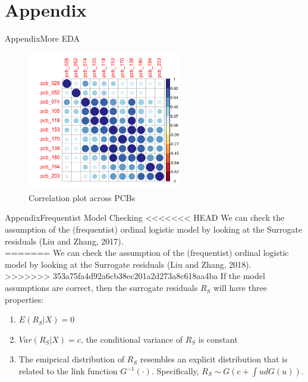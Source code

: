 \documentclass{beamer}\usepackage[]{graphicx}\usepackage[]{color}
\begin{document}
\section{Appendix}
\begin{frame}{Appendix}{More EDA}
\begin{figure}
  \centering
  \includegraphics[width=0.6\textwidth]{corrplot_PCB.png}
\caption{Correlation plot across PCBs}
\label{fig:corrPCB}
\end{figure}
\end{frame}
\begin{frame}{Appendix}{Frequentist Model Checking}
<<<<<<< HEAD
We can check the assumption of the (frequentist) ordinal logistic model by looking at the Surrogate residuals (Liu and Zhang, 2017).\\
=======
We can check the assumption of the (frequentist) ordinal logistic model by looking at the Surrogate residuals (Liu and Zhang, 2018).\\
>>>>>>> 353a75fa4d92a6cb38ec201a2d273a8c618aa4ba
\medskip
If the model assumptions are correct, then the surrogate residuals $R_S$ will have three properties:
\begin{enumerate}
 \item $E(R_S|X)=0$
 \item $Var(R_S|X)=c$, the conditional variance of $R_S$ is constant
 \item The emiprical distribution of $R_S$ resembles an explicit distribution that is related to the link function $G^{-1}(\cdot)$. Specifically, $R_S\sim G(c+\int ud G(u))$.
\end{enumerate}
\end{frame}
\end{document}
